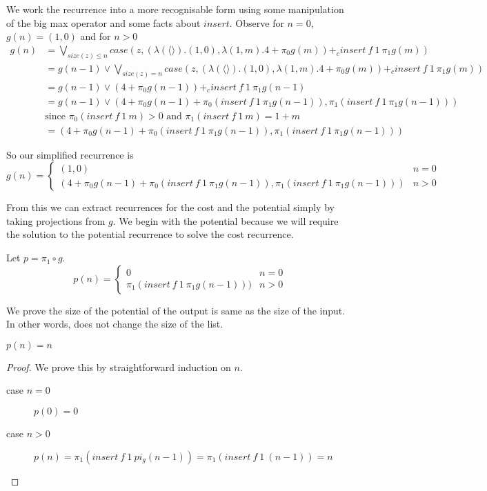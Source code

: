 We work the recurrence into a more recognisable form using some manipulation of the big max operator and some facts about $insert$.
Observe for $n=0$, $g(n) = (1,0)$ and for $n>0$
\begin{align*}
  g(n) &= \bigvee_{size(z)\leq n} case(z,(\lambda(\langle\rangle).(1,0),\lambda(1,m).4 + \pi_0 g(m)) +_c insert\ f\ 1\ \pi_1g(m)) \\
  &= g(n-1) \vee \bigvee_{size(z) = n} case(z,(\lambda(\langle\rangle).(1,0),\lambda(1,m).4 + \pi_0 g(m)) +_c insert\ f\ 1\ \pi_1g(m)) \\
  &= g(n-1) \vee (4 + \pi_0 g(n-1)) +_c insert\ f\ 1\ \pi_1g(n-1) \\
  &= g(n-1) \vee (4 + \pi_0 g(n-1) + \pi_0 (insert\ f\ 1\ \pi_1g(n-1)), \pi_1 (insert\ f\ 1\ \pi_1g(n-1))) \\
  &\text{since $\pi_0 (insert\ f\ 1\ m) > 0$ and $\pi_1 (insert\ f\ 1\ m) = 1 + m$} \\
  &= (4 + \pi_0 g(n-1) + \pi_0 (insert\ f\ 1\ \pi_1g(n-1)), \pi_1 (insert\ f\ 1\ \pi_1g(n-1)))
\end{align*}

So our simplified recurrence is
\begin{equation}
  \label{eq:sort_rec_final}
  g(n) = \begin{cases}
    (1,0) & n=0 \\
    (4 + \pi_0 g(n-1) + \pi_0 (insert\ f\ 1\ \pi_1g(n-1)), \pi_1 (insert\ f\ 1\ \pi_1g(n-1))) & n > 0
  \end{cases}
\end{equation}

From this we can extract recurrences for the cost and the potential simply by taking projections from $g$.
We begin with the potential because we will require the solution to the potential recurrence to solve the cost recurrence.

Let $p = \pi_1 \circ g$.
\begin{equation}
  \label{eq:sort_rec_potential}
  p(n) = \begin{cases}
    0 & n=0 \\
    \pi_1 (insert\ f\ 1\ \pi_1g(n-1))) & n > 0
  \end{cases}
\end{equation}

We prove the size of the potential of the output is same as the size of the input.
In other words,  does not change the size of the list.
\begin{theorem}
  \label{thm:sort_potential}
  $p(n) = n$
\end{theorem}
\begin{proof}
  We prove this by straightforward induction on $n$.
  \begin{description}
    \item[case $n=0$] $p(0) = 0$\hfill \\
    \item[case $n>0$] $p(n) = \pi_1(insert\ f\ 1\ pi_g(n-1)) = \pi_1(insert\ f\ 1\ (n-1)) = n$
  \end{description}
\end{proof}

